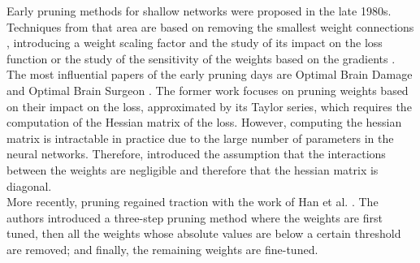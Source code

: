 Early pruning methods for shallow networks were proposed in the late 1980s.
Techniques from that area are based on removing the smallest weight connections
\cite{janowsky1989pruning}, introducing a weight scaling factor and the study of
its impact on the loss function \cite{DBLP:conf/nips/MozerS88} or the study of
the sensitivity of the weights based on the gradients
\cite{DBLP:journals/tnn/Karnin90}. The most influential papers of the early
pruning days are Optimal Brain Damage \cite{DBLP:conf/nips/CunDS89} and Optimal
Brain Surgeon
\cite{DBLP:conf/nips/HassibiS92,DBLP:conf/nips/HassibiSW93,DBLP:conf/icnn/HassibiSW93}.
The former work focuses on pruning weights based on their impact on the loss,
approximated by its Taylor series, which requires the computation of the Hessian
matrix of the loss. However, computing the hessian matrix is intractable in
practice due to the large number of parameters in the neural networks.
Therefore, \citeauthor{DBLP:conf/icnn/HassibiSW93}
\cite{DBLP:conf/icnn/HassibiSW93} introduced the assumption that the
interactions between the weights are negligible and therefore that the hessian
matrix is diagonal.\\


More recently, pruning regained traction with the work of Han et al.
\cite{DBLP:conf/nips/HanPTD15}. The authors introduced a three-step pruning
method where the weights are first tuned, then all the weights whose absolute
values are below a certain threshold are removed; and finally, the remaining weights
are fine-tuned. \\


